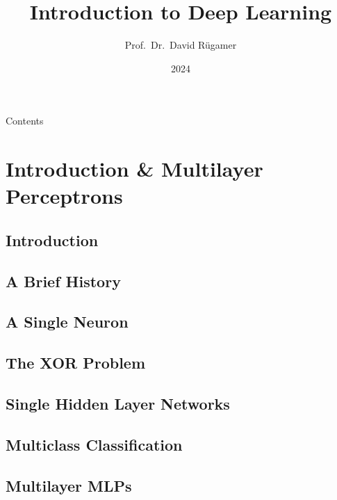 \documentclass[13pt,compress]{beamer}
\title{Introduction to Deep Learning}
\author{Prof.~Dr.~David R\"ugamer}
\institute{LMU Munich, MCML}
\date{2024}
\begin{document}



\begin{frame}[plain]
  \titlepage
\end{frame}
\begin{frame}[plain]{Contents}
\begin{small}
\tableofcontents[sectionstyle=show/show, subsectionstyle=hide/hide]
\end{small}
\end{frame}
\section{Introduction \& Multilayer Perceptrons}
\subsection{Introduction}

\subsection{A Brief History}

\subsection {A Single Neuron}

\subsection {The XOR Problem}

\subsection{Single Hidden Layer Networks}

\subsection{Multiclass Classification}

\subsection{Multilayer MLPs}

\end{document}

